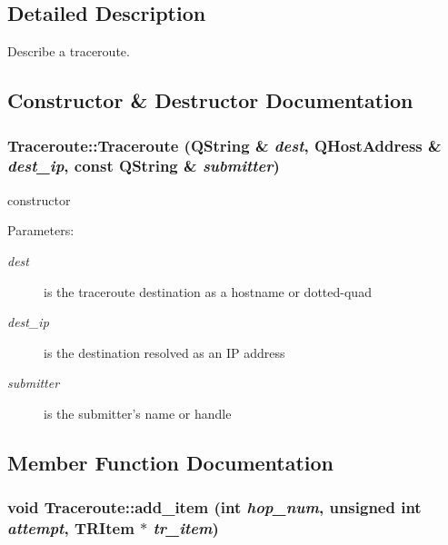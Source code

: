 \subsection{Detailed Description}
Describe a traceroute. 

\subsection{Constructor \& Destructor Documentation}
\hypertarget{classTraceroute_974f65271f48eabb3e4ff6be4bcada46}{
\subsubsection[Traceroute]{\setlength{\rightskip}{0pt plus 5cm}Traceroute::Traceroute (QString \& {\em dest}, \/  QHostAddress \& {\em dest\_\-ip}, \/  const QString \& {\em submitter})}}
\label{classTraceroute_974f65271f48eabb3e4ff6be4bcada46}


constructor \begin{Desc}
\item[Parameters:]
\begin{description}
\item[{\em dest}]is the traceroute destination as a hostname or dotted-quad \item[{\em dest\_\-ip}]is the destination resolved as an IP address \item[{\em submitter}]is the submitter's name or handle \end{description}
\end{Desc}


\subsection{Member Function Documentation}
\hypertarget{classTraceroute_00408735f9ec52c676aca621945a4397}{
\subsubsection[add\_\-item]{\setlength{\rightskip}{0pt plus 5cm}void Traceroute::add\_\-item (int {\em hop\_\-num}, \/  unsigned int {\em attempt}, \/  {\bf TRItem} $\ast$ {\em tr\_\-item})}}
\label{classTraceroute_00408735f9ec52c676aca621945a4397}


